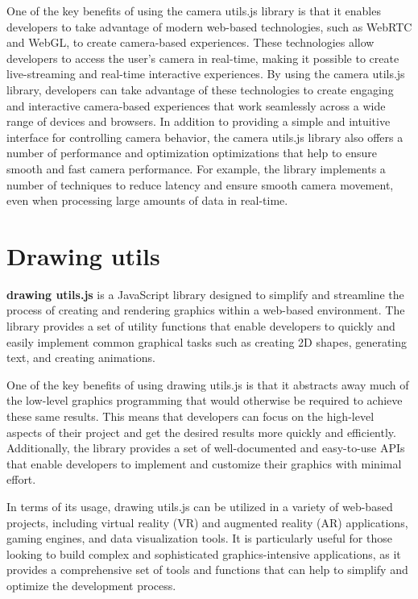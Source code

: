One of the key benefits of using the camera utils.js library is that it enables developers to take advantage of 
modern web-based technologies, such as WebRTC and WebGL, to create camera-based experiences. These technologies 
allow developers to access the user's camera in real-time, making it possible to create live-streaming and 
real-time interactive experiences. By using the camera utils.js library, developers can take advantage of these 
technologies to create engaging and interactive camera-based experiences that work seamlessly across a wide range of devices and browsers.
In addition to providing a simple and intuitive interface for controlling camera behavior, the camera utils.js 
library also offers a number of performance and optimization optimizations that help to ensure smooth and fast 
camera performance. For example, the library implements a number of techniques to reduce latency and ensure 
smooth camera movement, even when processing large amounts of data in real-time.

\section{Drawing utils}
\textbf{drawing utils.js} is a JavaScript library designed to simplify and streamline the process of 
creating and rendering graphics within a web-based environment. The library provides a set of utility 
functions that enable developers to quickly and easily implement common graphical tasks such as 
creating 2D shapes, generating text, and creating animations.

One of the key benefits of using drawing utils.js is that it abstracts away much of the 
low-level graphics programming that would otherwise be required to achieve these same results. 
This means that developers can focus on the high-level aspects of their project and get the 
desired results more quickly and efficiently. Additionally, the library provides a set of 
well-documented and easy-to-use APIs that enable developers to implement and customize 
their graphics with minimal effort.

In terms of its usage, drawing utils.js can be utilized in a variety of web-based projects, 
including virtual reality (VR) and augmented reality (AR) applications, gaming engines, 
and data visualization tools. It is particularly useful for those looking to build complex 
and sophisticated graphics-intensive applications, as it provides a comprehensive set of 
tools and functions that can help to simplify and optimize the development process.

